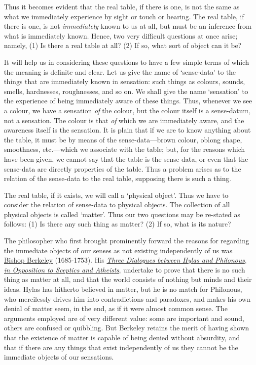 \documentclass[oneside,letterpaper,12pt]{book}
\begin{document}
Thus it becomes evident that the real table, if there is one, is not the
same as what we immediately experience by sight or touch or hearing. The
real table, if there is one, is not \emph{immediately} known to us at
all, but must be an inference from what is immediately known. Hence, two
very difficult questions at once arise; namely, (1) Is there a real
table at all? (2) If so, what sort of object can it be?

It will help us in considering these questions to have a few simple
terms of which the meaning is definite and clear. Let us give the name
of `sense-data' to the things that are
immediately known in sensation: such things as colours, sounds, smells,
hardnesses, roughnesses, and so on. We shall give the name
`sensation' to the experience of being
immediately aware of these things. Thus, whenever we see a colour, we
have a sensation \emph{of} the colour, but the colour itself is a
sense-datum, not a sensation. The colour is that \emph{of} which we are
immediately aware, and the awareness itself is the sensation. It is
plain that if we are to know anything about the table, it must be by
means of the sense-data---brown colour, oblong shape, smoothness,
etc.---which we associate with the table; but, for the reasons which
have been given, we cannot say that the table is the sense-data, or even
that the sense-data are directly properties of the table. Thus a problem
arises as to the relation of the sense-data to the real table, supposing
there is such a thing.

The real table, if it exists, we will call a `physical
object'. Thus we have to consider the relation of
sense-data to physical objects. The collection of all physical objects
is called `matter'. Thus our two
questions may be re-stated as follows: (1) Is there any such thing as
matter? (2) If so, what is its nature?

The philosopher who first brought prominently forward the reasons for
regarding the immediate objects of our senses as not existing
independently of us was \href{https://plato.stanford.edu/entries/berkeley/}
{Bishop Berkeley} (1685-1753). His \href{https://archive.org/details/threedialoguesbe00berkiala}
{\emph{Three Dialogues between Hylas and Philonous, in Opposition to Sceptics and Atheists}}, 
undertake to prove that there is no such thing as matter at
all, and that the world consists of nothing but minds and their ideas.
Hylas has hitherto believed in matter, but he is no match for Philonous,
who mercilessly drives him into contradictions and paradoxes, and makes
his own denial of matter seem, in the end, as if it were almost common
sense. The arguments employed are of very different value: some are
important and sound, others are confused or quibbling. But Berkeley
retains the merit of having shown that the existence of matter is
capable of being denied without absurdity, and that if there are any
things that exist independently of us they cannot be the immediate
objects of our sensations.
\end{document}
